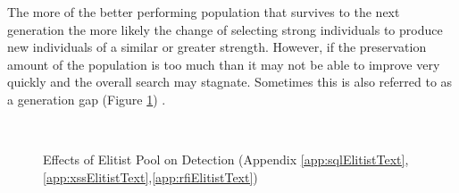 The more of the better performing population that survives to the next generation the more likely the change of selecting strong individuals to produce new individuals of a similar or greater strength.  However, if the preservation amount of the population is too much than it may not be able to improve very quickly and the overall search may stagnate.  Sometimes this is also referred to as a generation gap (Figure \ref{fig:resElitist}) \cite{optimizationOfControlParameters}.

\begin{figure}[hb]
	\centering
	\\
	\caption{Effects of Elitist Pool on Detection (Appendix \ref{app:sqlElitistText},\ref{app:xssElitistText},\ref{app:rfiElitistText})}
	\label{fig:resElitist}
\end{figure}

